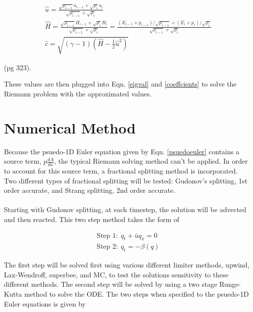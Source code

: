 \documentclass{article}%
\numberwithin{equation}{section}
\begin{document}
\begin{equation}
\begin{split}
\hat{u}= \frac{\sqrt{\rho_{i - 1}} u_{i-1} + \sqrt{\rho_i} u_i}{\sqrt{\rho_{i-1}} + \sqrt{\rho_i}}  \\
\hat{H} = \frac{\sqrt{\rho_{i - 1}} H_{i-1} + \sqrt{\rho_i} H_i}{\sqrt{\rho_{i-1}} + \sqrt{\rho_i}} = \frac{(E_{i-1} + p_{i-1})/\sqrt{\rho_{i - 1}}+ (E_i + p_i) / \sqrt{\rho_i} }{\sqrt{\rho_{i-1}} + \sqrt{\rho_i}} \\
\hat{c} = \sqrt{(\gamma - 1) \left( \hat{H} - \frac{1}{2} \hat{u}^2 \right)}
\end{split}
\end{equation}

(pg 323).

These values are then plugged into Eqn. \ref{eigval} and \ref{coeffcients} to solve the Riemann problem with the approximated values.


\section{Numerical Method}
Because the psuedo-1D Euler equation given by Eqn. \ref{psuedoeuler} contains a source term, $p \frac{dA}{dx}$, the typical Riemann solving method can't be applied. In order to account for this source term, a fractional splitting method is incorporated. Two different types of fractional splitting will be tested: Gudonov's splitting, 1st order accurate, and Strang splitting, 2nd order accurate. 
\\
\\
Starting with Gudonov splitting, at each timestep, the solution will be advected and then reacted. This two step method takes the form of

\begin{equation}
\begin{split}
\text{Step 1:} \ \ q_t + \bar{u} q_x = 0 \\
\text{Step 2:} \ \ q_t = -\beta(q)
\end{split}
\end{equation}  

The first step will be solved first using various different limiter methods, upwind, Lax-Wendroff, superbee, and MC, to test the solutions sensitivity to these different methods. The second step will be solved by using a two stage Runge-Kutta method to solve the ODE. The two steps when specified to the psuedo-1D Euler equations is given by
\end{document}
